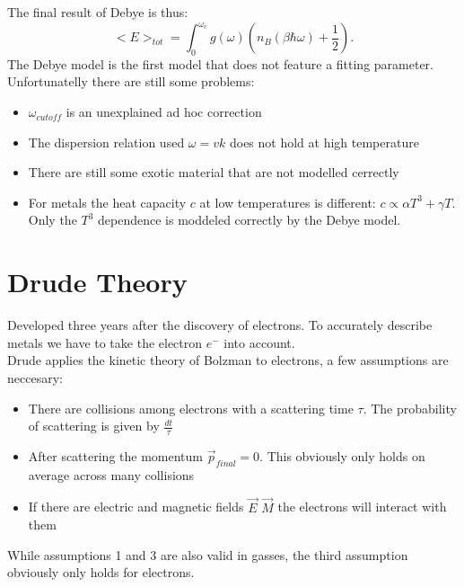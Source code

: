 \documentclass{report}
\begin{document}
The final result of Debye is thus: \[
	<E>_{tot} = \int_0^{\omega_c} g(\omega) \left( n_B(\beta \hbar \omega) + \frac{1}{2} \right) 
.\] 
The Debye model is the first model that does not feature a fitting parameter. Unfortunatelly there are still some problems:
\begin{itemize}
	\item $\omega_{cutoff}$ is an unexplained ad hoc correction
	\item The dispersion relation used $\omega = vk$ does not hold at high temperature
	\item There are still some exotic material that are not modelled cerrectly
	\item For metals the heat capacity $c$ at low temperatures is different: $c \propto \alpha T^3 + \gamma T$. \\
		Only the $T^3$ dependence is moddeled correctly by the Debye model.
\end{itemize}

\chapter{Drude Theory}
Developed three years after the discovery of electrons. To accurately describe metals we have to take the electron $e^-$ into account. \\
Drude applies the kinetic theory of Bolzman to electrons, a few assumptions are neccesary: 
\begin{itemize}
	\item There are collisions among electrons with a scattering time $\tau$. The probability of scattering is given by $\frac{dt}{\tau}$
	\item After scattering the momentum $\vec{p}_{final} = 0$. This obviously only holds on average across many collisions
	\item If there are electric and magnetic fields $\vec{E}$ $\vec{M}$ the electrons will interact with them
\end{itemize}
While assumptions 1 and 3 are also valid in gasses, the third assumption obviously only holds for electrons.
\end{document}
